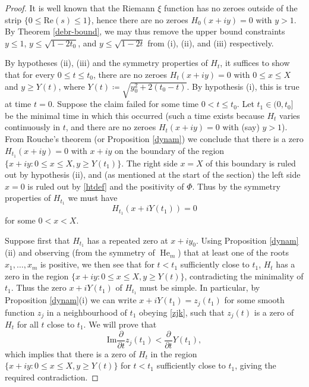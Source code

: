 \begin{proof}  It is well known that the Riemann $\xi$ function has no zeroes outside of the strip $\{ 0 \leq \mathrm{Re}(s) \leq 1 \}$, hence there are no zeroes $H_0(x+iy)=0$ with $y > 1$.  By Theorem \ref{debr-bound}, we may thus remove the upper bound constraints $y \leq 1$, $y \leq \sqrt{1-2t_0}$, and $y \leq \sqrt{1-2t}$ from (i), (ii), and (iii) respectively.

By hypotheses (ii), (iii) and the symmetry properties of $H_t$, it suffices to show that for every $0 \leq t \leq t_0$, there are no zeroes $H_t(x+iy) = 0$ with $0 \leq x \leq X$ and $y \geq Y(t)$, where $Y(t) \coloneqq \sqrt{y_0^2 + 2(t_0-t)}$.  By hypothesis (i), this is true at time $t=0$.  Suppose the claim failed for some time $0 < t \leq t_0$.  Let $t_1 \in (0,t_0]$ be the minimal time in which this occurred (such a time exists because $H_t$ varies continuously in $t$, and there are no zeroes $H_t(x+iy)=0$ with (say) $y>1$).  From Rouche's theorem (or Proposition \ref{dynam}) we conclude that there is a zero $H_{t_1}(x+iy)=0$ with $x+iy$ on the boundary of the region $\{ x+iy: 0 \leq	 x \leq X, y \geq Y(t_1) \}$.  The right side $x=X$ of this boundary is ruled out by hypothesis (ii), and (as mentioned at the start of the section) the left side $x=0$ is ruled out by \eqref{htdef} and the positivity of $\Phi$.  Thus by the symmetry properties of $H_{t_1}$ we must have
$$ H_{t_1}(x+iY(t_1)) = 0$$
for some $0 < x < X$.

Suppose first that $H_{t_1}$ has a repeated zero at $x+iy_0$.  Using Proposition \ref{dynam}(ii) and observing (from the symmetry of $\operatorname{He}_m$) that at least one of the roots $x_1,\dots,x_m$ is positive, we then see that for $t<t_1$ sufficiently close to $t_1$, $H_t$ has a zero in the region $\{ x+iy: 0 \leq x \leq X, y \geq Y(t) \}$, contradicting the minimality of $t_1$.  Thus the zero $x+i Y(t_1)$ of $H_{t_1}$ must be simple.  In particular, by Proposition \ref{dynam}(i) we can write $x+i Y(t_1) = z_j(t_1)$ for some smooth function $z_j$ in a neighbourhood of $t_1$ obeying \eqref{zjk}, such that $z_j(t)$ is a zero of $H_t$ for all $t$ close to $t_1$.  We will prove that
\begin{equation}\label{im}
\mathrm{Im} \frac{\partial}{\partial t} z_j( t_1 ) < \frac{\partial}{\partial t} Y(t_1),
\end{equation}
which implies that there is a zero of $H_t$ in the region $\{ x+iy: 0 \leq x \leq X, y \geq Y(t) \}$  for $t<t_1$ sufficiently close to $t_1$, giving the required contradiction.  


\end{proof}
